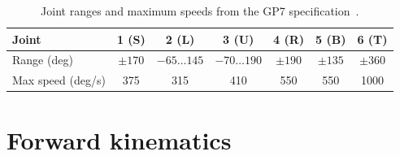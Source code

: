 \documentclass[11pt,a4paper]{article}
\begin{document}
\begin{table}[h]
\centering\small
\begin{tabular}{lcccccc}
\toprule
Joint & 1 (S) & 2 (L) & 3 (U) & 4 (R) & 5 (B) & 6 (T) \\
\midrule
Range (deg) & \(\pm170\) & \(-65\ldots145\) & \(-70\ldots190\) & \(\pm190\) & \(\pm135\) & \(\pm360\) \\
Max speed (deg/s) & 375 & 315 & 410 & 550 & 550 & 1000 \\
\bottomrule
\end{tabular}
\caption{Joint ranges and maximum speeds from the GP7 specification~\cite{gp7spec}.}
\label{tab:limits}
\end{table}

\section{Forward kinematics}
\end{document}
